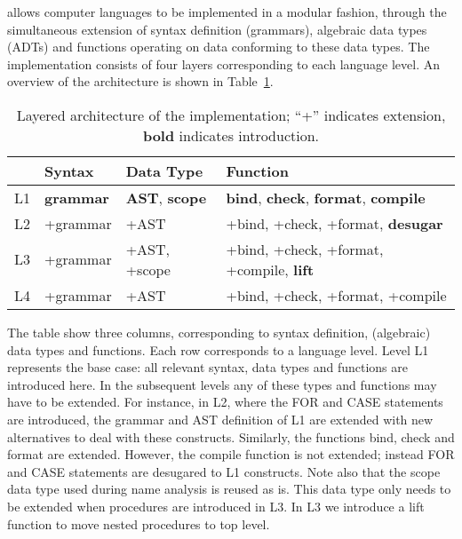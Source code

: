 \noindent \Rascal allows computer languages to be implemented in a modular
fashion, through the simultaneous extension of syntax definition
(grammars), algebraic data types (ADTs) and functions operating on
data conforming to these data types. The \oberon implementation
consists of four layers corresponding to each language level. An
overview of the architecture is shown in Table~\ref{TBL:rascalArch}.

\begin{table}
\begin{center}\small
\begin{tabular}{|l||l|l|l|}\hline
   &  Syntax & Data Type & Function \\\hline\hline
L1 &  \textbf{grammar} & \textbf{AST}, \textbf{scope} & 
\textbf{bind}, \textbf{check}, \textbf{format}, \textbf{compile} \\\hline 
L2 & +grammar & +AST & +bind, +check, +format, \textbf{desugar} \\\hline
L3 & +grammar & +AST, +scope & +bind, +check, +format, +compile, \textbf{lift} \\\hline
L4 & +grammar & +AST & +bind, +check, +format, +compile \\\hline
\end{tabular}
\end{center}
\caption{Layered architecture of the \Rascal \oberon implementation;
  ``+'' indicates extension, \textbf{bold} indicates introduction.\label{TBL:rascalArch}}
\end{table}

The table show three columns, corresponding to syntax definition,
(algebraic) data types and functions. Each row corresponds to a
language level. Level L1 represents the base case: all relevant
syntax, data types and functions are introduced here. In the
subsequent levels any of these types and functions may have to be
extended. For instance, in L2, where the FOR and CASE statements are
introduced, the grammar and AST definition of L1 are extended with new
alternatives to deal with these constructs. Similarly, the functions
bind, check and format are extended. However, the compile function is
not extended; instead FOR and CASE statements are desugared to L1
constructs. Note also that the scope data type used during name
analysis is reused as is. This data type only needs to be extended
when procedures are introduced in L3. In L3 we introduce a lift
function to move nested procedures to top level.

